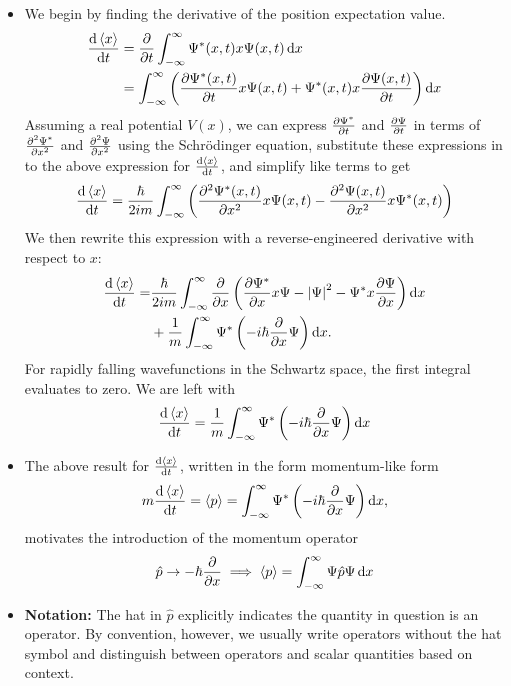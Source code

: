 \documentclass[11pt, a4paper]{article}
\newcommand{\diff}{\mathop{}\!\mathrm{d}} %
\newcommand{\Schro}{Schr\"{o}dinger\xspace}
\renewcommand{\P}{\Psi}  %
\begin{document}
\begin{itemize}
	\item We begin by finding the derivative of the position expectation value.
	\begin{align*}
		\dv{\ev{x}}{t} &= \pdv{t}\int_{-\infty}^{\infty} \Psi^{*}(x, t)x\Psi(x,t)\diff x \\
		&= \int_{-\infty}^{\infty} \left(\pdv{\P^{*}(x, t)}{t} x \P(x, t) + \P^{*}(x, t)x\pdv{\P(x, t)}{t}\right)\diff x
	\end{align*}
	Assuming a real potential $ V(x) $, we can express $ \pdv{\P^{*}}{t} $ and $ \pdv{\P}{t} $ in terms of $ \pdv[2]{\P^{*}}{x} $ and $ \pdv[2]{\P}{x} $ using the \Schro equation, substitute these expressions in to the above expression for $ \dv{\ev{x}}{t} $, and simplify like terms to get
	\begin{equation*}
		\dv{\ev{x}}{t} = \frac{\hbar}{2im}\int_{-\infty}^{\infty} \left( \pdv[2]{\P^{*}(x, t)}{x} x \P(x, t) - \pdv[2]{\P(x, t)}{x} x \P^{*}(x, t) \right)
	\end{equation*}
	We then rewrite this expression with a reverse-engineered derivative with respect to $ x $:
	\begin{align*}
		\dv{\ev{x}}{t} = & \frac{\hbar}{2im} \int_{-\infty}^{\infty} \pdv{x}\left(\pdv{\P^{*}}{x}x\P - \abs{\P}^{2} - \P^{*}x\pdv{\P}{x}\right)\diff x\\
		& + \frac{1}{m} \int_{-\infty}^{\infty} \P^{*} \left(-i\hbar \pdv{x}\P\right)\diff x.
	\end{align*}
	For rapidly falling wavefunctions in the Schwartz space, the first integral evaluates to zero. We are left with
	\begin{equation*}
		\dv{\ev{x}}{t} = \frac{1}{m} \int_{-\infty}^{\infty} \P^{*} \left(-i\hbar \pdv{x}\P\right)\diff x
	\end{equation*}
	
	\item The above result for $ \dv{\ev{x}}{t} $, written in the form momentum-like form
	\begin{equation*}
		m \dv{\ev{x}}{t} = \ev{p} = \int_{-\infty}^{\infty} \P^{*} \left(-i\hbar \pdv{x}\P\right)\diff x,
	\end{equation*}
	motivates the introduction of the momentum operator
	\begin{equation*}
		\hat{p} \to - \hbar \pdv{x} \implies \ev{p} = \int_{-\infty}^{\infty} \P \hat{p} \P \diff x
	\end{equation*}
	
	\item \textbf{Notation:} The hat in $ \hat{p} $ explicitly indicates the quantity in question is an operator. By convention, however, we usually write operators without the hat symbol and distinguish between operators and scalar quantities based on context.
	

\end{itemize}
\end{document}
